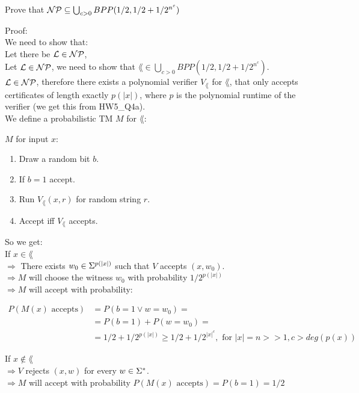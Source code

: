 Prove that $\mathcal{N}\mathcal{P} \subseteq \bigcup_{c>0} BPP(1/2, 1/2 + 1/2^{n^c})$

Proof: \\
We need to show that: \\
Let there be $\mathcal{L} \in \mathcal{N}\mathcal{P}$,  \\

Let $\mathcal{L} \in \mathcal{N}\mathcal{P}$, we need to show that $\lang \in \bigcup_{c>0} BPP(1/2, 1/2 + 1/2^{n^c})$. \\
$\mathcal{L} \in \mathcal{N}\mathcal{P}$, therefore there exists a polynomial verifier $V_\lang$ for $\lang$, that only accepts
certificates of length exactly $p(|x|)$, where $p$ is the polynomial runtime of the verifier
(we get this from HW5\_Q4a). \\
We define a probabilistic TM $M$ for $\lang$:

$M$ for input $x$:
\begin{enumerate}[1., itemsep=5pt]

    \item Draw a random bit $b$.

    \item If $b=1$ accept.

    \item Run $V_\lang(x, r)$ for random string $r$.

    \item Accept iff $V_\lang$ accepts.

\end{enumerate}

So we get: \\
If $x \in \lang$ \\
$\Rightarrow $ There exists $w_0 \in \Sigma^{p(|x|)}$ such that $V$ accepts $(x, w_0)$. \\
$\Rightarrow M$ will choose the witness $w_0$ with probability $1/2^{p(|x|)}$ \\
$\Rightarrow M$ will accept with probability:

$
    \begin{aligned}
        P(M(x) \text{ accepts}) & = P(b=1 \vee w=w_0) =                                                             \\
                                & = P(b=1) +  P(w=w_0) =                                                            \\
                                & = 1/2 + 1/2^{p(|x|)} \geq 1/2 + 1/2^{|x|^c}, \text{ for } |x|=n>>1, c > deg(p(x))
    \end{aligned}
$

If $x \notin \lang$ \\
$\Rightarrow V$ rejects $(x, w)$ for every $w \in \Sigma^*$. \\
$\Rightarrow M$ will accept with probability $P(M(x) \text{ accepts}) = P(b=1) = 1/2$  \\

